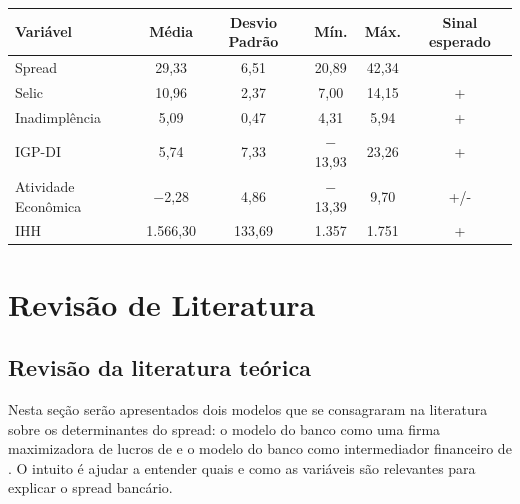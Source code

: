 \documentclass[a4paper,
               article,
               12pt,
               openany,
               oneside,
               english,
               brazil]{abntex2}
\numberwithin{equation}{section}
\begin{document}
    \begin{table}[h]
        {%
            \begin{tabular}
                {@{\extracolsep{5pt}}lccccc}
                \midrule
                Variável              & \multicolumn{1}{c}{Média} & \multicolumn{1}{c}{Desvio Padrão} & \multicolumn{1}{c}{Mín.} & \multicolumn{1}{c}{Máx.} & \multicolumn{1}{c}{Sinal esperado} \\
                \midrule
                Spread                & 29,33                     & 6,51                              & 20,89                    & 42,34                    &  \\
                Selic                 & 10,96                     & 2,37                              & 7,00                     & 14,15                    & + \\
                Inadimplência         & 5,09                      & 0,47                              & 4,31                     & 5,94                     & + \\
                IGP-DI                & 5,74                      & 7,33                              & $-$13,93                 & 23,26                    & + \\
                Atividade Econômica   & $-$2,28                   & 4,86                              & $-$13,39                 & 9,70                     & +/- \\
                IHH                   & 1.566,30                  & 133,69                            & 1.357                    & 1.751                    & + \\
                \midrule
            \end{tabular}
        }
        {}
    \end{table}


\section{Revisão de Literatura}
\subsection{Revisão da literatura teórica}

    Nesta seção serão apresentados dois modelos que se consagraram na literatura sobre os determinantes do spread: o modelo do banco como uma firma maximizadora de lucros de \textcite{klein} e o modelo do banco como intermediador financeiro de \textcite{hoesaunders}. O intuito é ajudar a entender quais e como as variáveis são relevantes para explicar o spread bancário.
\end{document}
